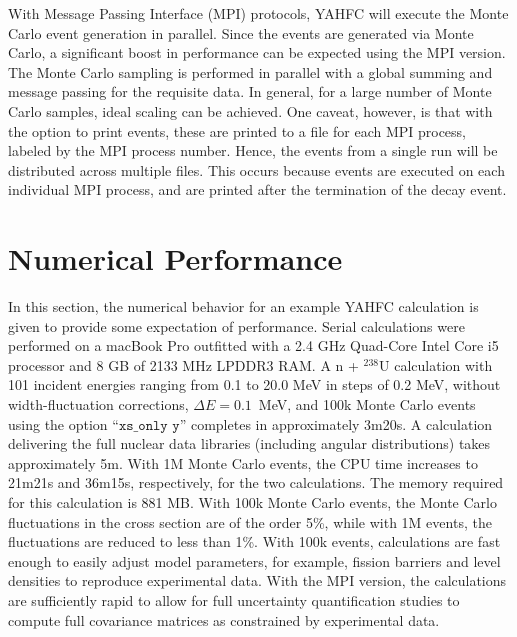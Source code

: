 \documentclass[
10pt,
showpacs,preprintnumbers,footinbib,
amsfonts,amsmath,amssymb,
aps,
prc,twocolumn,groupedaddress,superscriptaddress,
showkeys,
nofootinbib
]{revtex4-1}
\begin{document}
With Message Passing Interface (MPI) protocols, YAHFC will execute the Monte Carlo event generation in parallel. Since the events are generated via Monte Carlo, a significant boost in performance can be expected using the MPI version. The Monte Carlo sampling is performed in parallel with a global summing and message passing for the requisite data. In general, for a large number of Monte Carlo samples, ideal scaling can be achieved. One caveat, however, is that with the option to print events, these are printed to a file for each MPI process, labeled by the MPI process number. Hence, the events from a single run will be distributed across multiple files. This occurs because events are executed on each individual MPI process, and are printed after the termination of the decay event. 

\section{Numerical Performance}
In this section, the numerical behavior for an example YAHFC calculation is given to provide some expectation of performance. Serial calculations were performed on a macBook Pro outfitted with a 2.4 GHz Quad-Core Intel Core i5 processor and 8 GB of 2133 MHz LPDDR3 RAM. A n + $^{238}$U calculation with 101 incident energies ranging from 0.1 to 20.0 MeV in steps of 0.2 MeV, without width-fluctuation corrections, $\Delta E = 0.1$~MeV, and 100k Monte Carlo events using the option ``${\texttt{xs\_only y}}$'' completes in approximately 3m20s. A calculation delivering the full nuclear data libraries (including angular distributions) takes approximately 5m. With 1M Monte Carlo events, the CPU time increases to 21m21s and 36m15s, respectively, for the two calculations. The memory required for this calculation is 881 MB. With 100k Monte Carlo events, the Monte Carlo fluctuations in the cross section are of the order 5\%, while with 1M events, the fluctuations are reduced to less than 1\%. With 100k events, calculations are fast enough to easily adjust model parameters, for example, fission barriers and level densities to reproduce experimental data. With the MPI version, the calculations are sufficiently rapid to allow for full uncertainty quantification studies to compute full covariance matrices as constrained by experimental data.

\appendix
\end{document}
